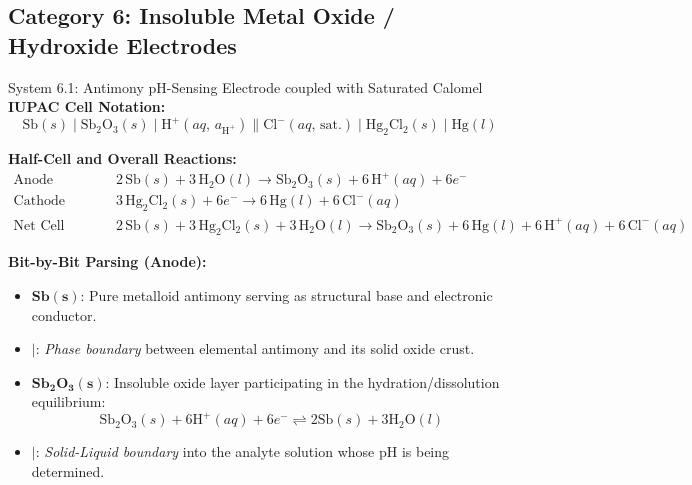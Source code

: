 \documentclass[10pt,a4paper]{article}
\begin{document}
\subsection{Category 6: Insoluble Metal Oxide / Hydroxide Electrodes}
\begin{examplebox}{System 6.1: Antimony pH-Sensing Electrode coupled with Saturated Calomel}
\textbf{IUPAC Cell Notation:}
\begin{equation*}
    \text{Sb}(s) \mid \text{Sb}_2\text{O}_3(s) \mid \text{H}^+(aq,\, a_{\text{H}^+}) \parallel \text{Cl}^-(aq,\, \text{sat.}) \mid \text{Hg}_2\text{Cl}_2(s) \mid \text{Hg}(l)
\end{equation*}

\textbf{Half-Cell and Overall Reactions:}
\begin{align*}
    \text{Anode (Oxidation):} \quad & 2\,\text{Sb}(s) + 3\,\text{H}_2\text{O}(l) \longrightarrow \text{Sb}_2\text{O}_3(s) + 6\,\text{H}^+(aq) + 6e^- \\
    \text{Cathode (Reduction):} \quad & 3\,\text{Hg}_2\text{Cl}_2(s) + 6e^- \longrightarrow 6\,\text{Hg}(l) + 6\,\text{Cl}^-(aq) \\
    \text{Net Cell Reaction:} \quad & 2\,\text{Sb}(s) + 3\,\text{Hg}_2\text{Cl}_2(s) + 3\,\text{H}_2\text{O}(l) \longrightarrow \text{Sb}_2\text{O}_3(s) + 6\,\text{Hg}(l) + 6\,\text{H}^+(aq) + 6\,\text{Cl}^-(aq)
\end{align*}

\textbf{Bit-by-Bit Parsing (Anode):}
\begin{itemize}[leftmargin=*]
    \item $\mathbf{Sb(s)}$: Pure metalloid antimony serving as structural base and electronic conductor.
    \item $\mathbf{\mid}$: \textit{Phase boundary} between elemental antimony and its solid oxide crust.
    \item $\mathbf{Sb_2O_3(s)}$: Insoluble oxide layer participating in the hydration/dissolution equilibrium:
    \begin{equation*}
        \text{Sb}_2\text{O}_3(s) + 6\text{H}^+(aq) + 6e^- \rightleftharpoons 2\text{Sb}(s) + 3\text{H}_2\text{O}(l)
    \end{equation*}
    \item $\mathbf{\mid}$: \textit{Solid-Liquid boundary} into the analyte solution whose $\text{pH}$ is being determined.
\end{itemize}
\end{examplebox}
\end{document}

